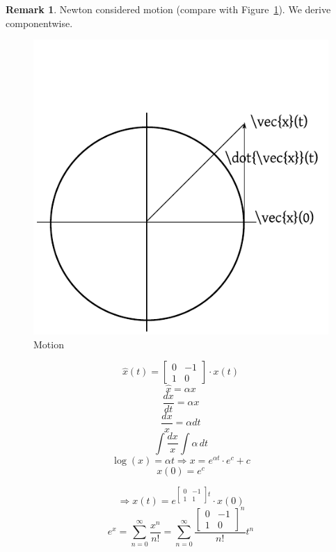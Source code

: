 \documentclass[a4paper,landscape,twocolumn]{article}
\theoremstyle{definition}
\newtheorem{rem}{Remark}
\begin{document}
\begin{rem}
  Newton considered motion (compare with Figure~\ref{img:motion}). We derive componentwise.
  \begin{figure}[!h]
    \begin{center}
      \includegraphics{img/motion.pdf}
      \caption{Motion}
      \label{img:motion}
    \end{center}
  \end{figure}
  \[ \hat{x}(t) = \begin{bmatrix} 0 & -1 \\ 1 & 0 \end{bmatrix} \cdot x(t) \]
  \[ \hat{x} = \alpha x \]
  \[ \frac{dx}{dt} = \alpha x \]
  \[ \frac{dx}{x} = \alpha dt \]
  \[ \int \frac{dx}{x} \int \alpha \, dt \]
  \[ \log(x) = \alpha t \Rightarrow x = e^{\alpha t} \cdot e^c + c \]
  \[ x(0) = e^c \]

  \[ \Rightarrow x(t) = e^{\begin{bmatrix} 0 & -1 \\ 1 & 1 \end{bmatrix} t} \cdot x(0) \]
  \[
    e^x = \sum_{n=0}^\infty \frac{x^n}{n!}
        = \sum_{n=0}^\infty \frac{\begin{bmatrix} 0 & -1 \\ 1 & 0 \end{bmatrix}^n}{n!} t^n
  \]


\end{rem}
\end{document}
